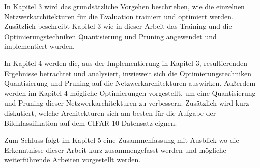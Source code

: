 In Kapitel 3 wird das grundsätzliche Vorgehen beschrieben, wie die einzelnen Netzwerkarchitekturen für die Evaluation trainiert und optimiert werden. Zusätzlich beschreibt Kapitel 3 wie in dieser Arbeit das Training und die Optimierungstechniken Quantisierung und Pruning angewendet und implementiert wurden. 

In Kapitel 4 werden die, aus der Implementierung in Kapitel 3, resultierenden Ergebnisse betrachtet und analysiert, inwieweit sich die Optimierungstechniken Quantisierung und Pruning auf die Netzwerkarchitekturen auswirken. Außerdem werden im Kapitel 4 mögliche Optimierungen vorgestellt, um eine Quantisierung und Pruning dieser Netzwerkarchitekturen zu verbessern. Zusätzlich wird kurz diskutiert, welche Architekturen sich am besten für die Aufgabe der Bildklassifikation auf dem CIFAR-10 Datensatz eignen.

Zum Schluss folgt im Kapitel 5 eine Zusammenfassung mit Ausblick wo die Erkenntnisse dieser Arbeit kurz zusammengefasst werden und mögliche weiterführende Arbeiten vorgestellt werden.
